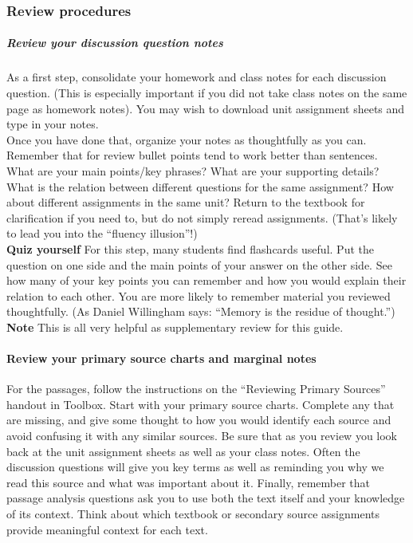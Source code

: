 \documentclass{article}
\begin{document}
  \subsubsection{Review procedures}
    \subparagraph{Review your discussion question notes}
    As a first step, consolidate your homework and class notes for each discussion
    question. (This is especially important if you did not take class notes on the same page
    as homework notes). You may wish to download unit assignment sheets and type in
    your notes. \\
    Once you have done that, organize your notes as thoughtfully as you can. Remember
    that for review bullet points tend to work better than sentences. What are your main
    points/key phrases? What are your supporting details? What is the relation between
    different questions for the same assignment? How about different assignments in the
    same unit? Return to the textbook for clarification if you need to, but do not simply
    reread assignments.  (That’s likely to lead you into the “fluency illusion”!) \\
    \textbf{Quiz yourself}
    For this step, many students find flashcards useful. Put the question on
    one side and the main points of your answer on the other side. See how many of your
    key points you can remember and how you would explain their relation to each other.
    You are more likely to remember material you reviewed thoughtfully.  (As Daniel
    Willingham says: “Memory is the residue of thought.”) \\
    \textbf{Note}
    This is all very helpful as supplementary review for this guide.
    \paragraph{Review your primary source charts and marginal notes}
    For the passages, follow the instructions on the “Reviewing Primary Sources” handout
    in Toolbox. Start with your primary source charts. Complete any that are missing, and
    give some thought to how you would identify each source and avoid confusing it with
    any similar sources. Be sure that as you review you look back at the unit assignment
    sheets as well as your class notes. Often the discussion questions will give you key
    terms as well as reminding you why we read this source and what was important about
    it. Finally, remember that passage analysis questions ask you to use both the text itself
    and your knowledge of its context. Think about which textbook or secondary source
    assignments provide meaningful context for each text.
\end{document}
